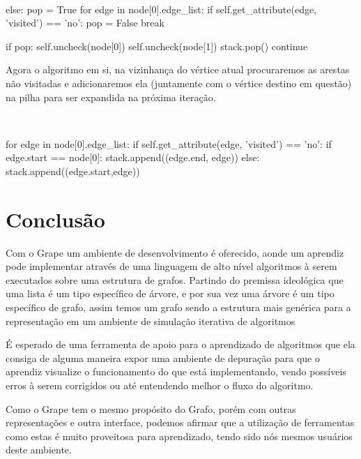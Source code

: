 \documentclass[a4paper]{abnt}
\begin{document}
\\
\begin{python}
            else:
                pop = True
                for edge in node[0].edge_list:
                    if self.get_attribute(edge, 'visited') == 'no':
                        pop = False
                        break

                if pop:
                    self.uncheck(node[0])
                    self.uncheck(node[1])
                    stack.pop()
                    continue
\end{python}

    Agora o algoritmo em si, na vizinhança do vértice atual procuraremos as arestas não visitadas e adicionaremos ela (juntamente com o vértice destino em questão) na pilha para ser expandida na próxima iteração.

\\
\begin{python}
            for edge in node[0].edge_list:
                if self.get_attribute(edge, 'visited') == 'no':
                    if edge.start == node[0]:
                        stack.append((edge.end, edge))
                    else:
                        stack.append((edge.start,edge))

\end{python}

\chapter{Conclusão}
\label{sec:conclusao}

Com o Grape um ambiente de desenvolvimento é oferecido, aonde um aprendiz pode implementar através de uma linguagem de alto nível algoritmos à serem executados sobre uma estrutura de grafos. Partindo do premissa ideológica que uma lista é um tipo específico de árvore, e por sua vez uma árvore é um tipo específico de grafo, assim temos um grafo sendo a estrutura mais genérica para a representação em um ambiente de simulação iterativa de algoritmos

É esperado de uma ferramenta de apoio para o aprendizado de algoritmos que ela consiga de alguma maneira expor uma ambiente de depuração para que o aprendiz visualize o funcionamento do que está implementando, vendo possíveis erros à serem corrigidos ou até entendendo melhor o fluxo do algoritmo.

Como o Grape tem o mesmo propósito do Grafo, porém com outras representações e outra interface, podemos afirmar que a utilização de ferramentas como estas é muito proveitosa para aprendizado, tendo sido nós mesmos usuários deste ambiente.
\end{document}
